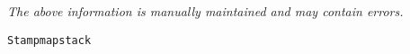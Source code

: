 \label{pkg:stampmapstack}

{\tiny \it The above information is manually maintained and may contain errors.}
\begin{verbatim}
Stampmapstack
\end{verbatim}
